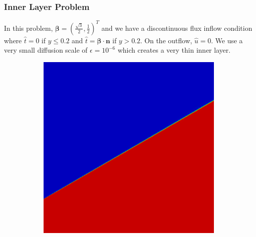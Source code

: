 \documentclass[letterpaper]{article}
\def\bbeta{\boldsymbol\beta}
\begin{document}
\subsubsection{Inner Layer Problem}
In this problem, $\bbeta=(\frac{\sqrt{3}}{2},\frac{1}{2})^T$ and we have a
discontinuous flux inflow condition where $\hat t=0$ if $y\le0.2$ and $\hat
t=\bbeta\cdot\mathbf{n}$ if $y>0.2$. On the outflow, $\hat u=0$. We use a very
small diffusion scale of $\epsilon=10^{-6}$ which creates a very thin inner
layer.

\begin{figure}[p]
\centering
\begin{subfigure}[t]{0.45\textwidth}
\centering
\includegraphics[width=\textwidth]{figs/InnerLayer/modified8nc.png}

\end{subfigure}
\end{figure}
\end{document}
